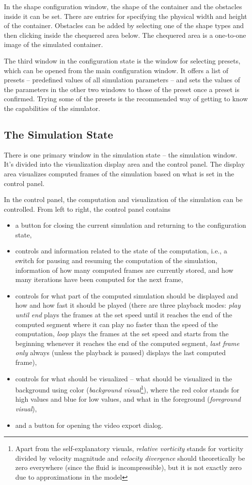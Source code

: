 \documentclass[11pt,a4paper,twoside,openright]{report}
\begin{document}
In the shape configuration window, the shape of the container and the obstacles inside it can be set. There are entries for specifying the physical width and height of the container. Obstacles can be added by selecting one of the shape types and then clicking inside the chequered area below. The chequered area is a one-to-one image of the simulated container.

The third window in the configuration state is the window for selecting presets, which can be opened from the main configuration window. It offers a list of presets -- predefined values of all simulation parameters -- and sets the values of the parameters in the other two windows to those of the preset once a preset is confirmed. Trying some of the presets is the recommended way of getting to know the capabilities of the simulator.

\subsection{The Simulation State}
There is one primary window in the simulation state -- the simulation window. It's divided into the visualization display area and the control panel. The display area visualizes computed frames of the simulation based on what is set in the control panel.

In the control panel, the computation and visualization of the simulation can be controlled. From left to right, the control panel contains
\begin{itemize}
	\item a button for closing the current simulation and returning to the configuration state,
	\item controls and information related to the state of the computation, i.e., a switch for pausing and resuming the computation of the simulation, information of how many computed frames are currently stored, and how many iterations have been computed for the next frame,
	\item controls for what part of the computed simulation should be displayed and how and how fast it should be played (there are three playback modes: \emph{play until end} plays the frames at the set speed until it reaches the end of the computed segment where it can play no faster than the speed of the computation, \emph{loop} plays the frames at the set speed and starts from the beginning whenever it reaches the end of the computed segment, \emph{last frame only} always (unless the playback is paused) displays the last computed frame),
	\item controls for what should be visualized -- what should be visualized in the background using color (\emph{background visual}\footnote{Apart from the self-explanatory visuals, \emph{relative vorticity} stands for vorticity divided by velocity magnitude and \emph{velocity divergence} should theoretically be zero everywhere (since the fluid is incompressible), but it is not exactly zero due to approximations in the model}), where the red color stands for high values and blue for low values, and what in the foreground (\emph{foreground visual}),
	\item and a button for opening the video export dialog.
\end{itemize}
\end{document}
